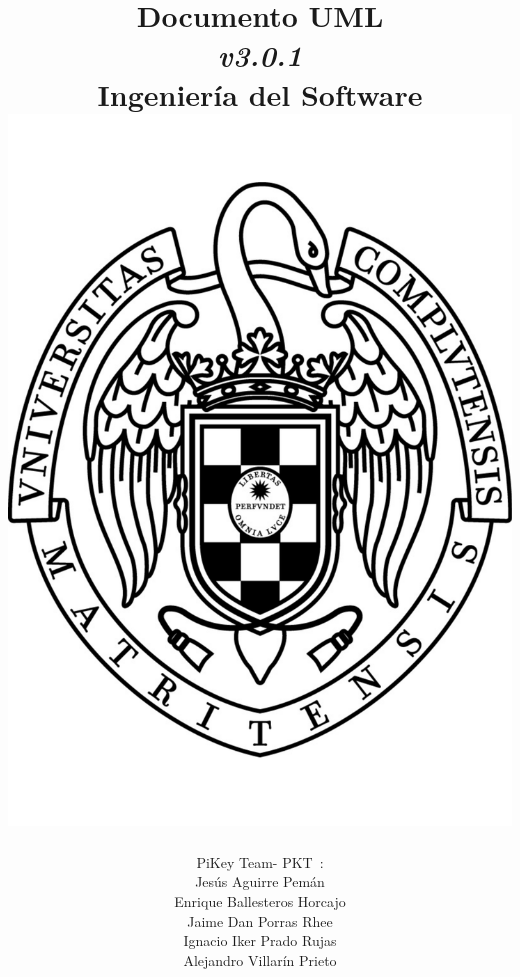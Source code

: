 \documentclass[spanish,a4paper,11pt, twoside]{report}	%
\newcommand*{\PKT}{\hbox{P}\kern-2.5pt\lower3.5pt\hbox{\small{K}}\kern-2.8pt\hbox{T}\kern-2pt}	%
\begin{document}
\title{\textbf{\huge{ Documento UML}} \\ 
	\textit{v3.0.1} \\	\vspace{0.1cm}
	\Large{Ingeniería del Software} \\
	\includegraphics[scale=0.3]{ucm.pdf}}
\author{ {\Large{PiKey Team-}} \PKT \ : \vspace{0.2cm} \\
	Jesús Aguirre Pemán \\
	 Enrique Ballesteros Horcajo \\
	 Jaime Dan Porras Rhee \\
	 Ignacio Iker Prado Rujas \\
	 Alejandro Villarín Prieto }
\date{\Today}
\maketitle
\end{document}
